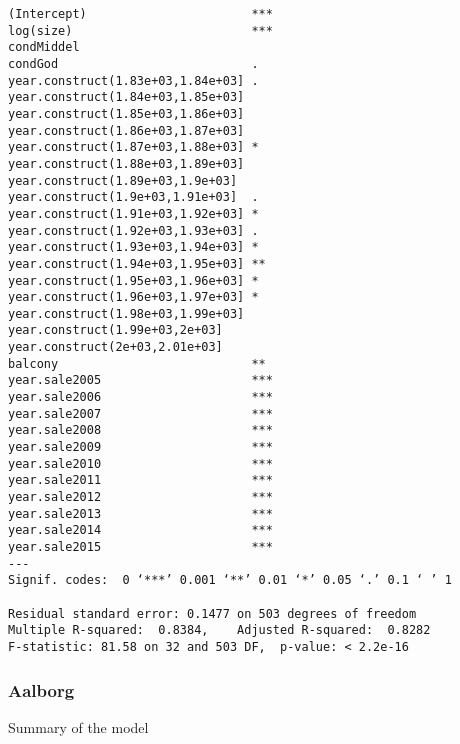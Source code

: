 \begin{lstlisting}
(Intercept)                       ***
log(size)                         ***
condMiddel                           
condGod                           .  
year.construct(1.83e+03,1.84e+03] .  
year.construct(1.84e+03,1.85e+03]    
year.construct(1.85e+03,1.86e+03]    
year.construct(1.86e+03,1.87e+03]    
year.construct(1.87e+03,1.88e+03] *  
year.construct(1.88e+03,1.89e+03]    
year.construct(1.89e+03,1.9e+03]     
year.construct(1.9e+03,1.91e+03]  .  
year.construct(1.91e+03,1.92e+03] *  
year.construct(1.92e+03,1.93e+03] .  
year.construct(1.93e+03,1.94e+03] *  
year.construct(1.94e+03,1.95e+03] ** 
year.construct(1.95e+03,1.96e+03] *  
year.construct(1.96e+03,1.97e+03] *  
year.construct(1.98e+03,1.99e+03]    
year.construct(1.99e+03,2e+03]       
year.construct(2e+03,2.01e+03]       
balcony                           ** 
year.sale2005                     ***
year.sale2006                     ***
year.sale2007                     ***
year.sale2008                     ***
year.sale2009                     ***
year.sale2010                     ***
year.sale2011                     ***
year.sale2012                     ***
year.sale2013                     ***
year.sale2014                     ***
year.sale2015                     ***
---
Signif. codes:  0 ‘***’ 0.001 ‘**’ 0.01 ‘*’ 0.05 ‘.’ 0.1 ‘ ’ 1

Residual standard error: 0.1477 on 503 degrees of freedom
Multiple R-squared:  0.8384,	Adjusted R-squared:  0.8282 
F-statistic: 81.58 on 32 and 503 DF,  p-value: < 2.2e-16
\end{lstlisting}

\subsubsection{Aalborg}

Summary of the model

